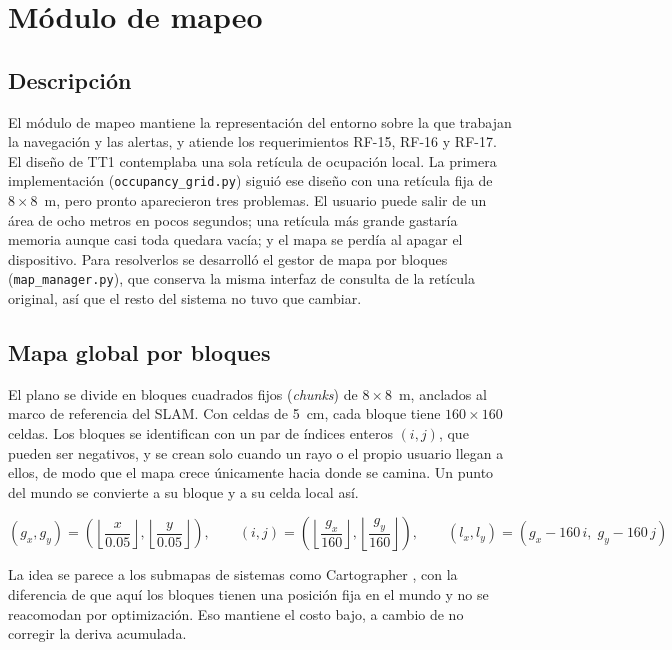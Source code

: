 \section{Módulo de mapeo}
\label{sec:dev_mapeo}

\subsection{Descripción}

El módulo de mapeo mantiene la representación del entorno sobre la que trabajan la
navegación y las alertas, y atiende los requerimientos RF-15, RF-16 y RF-17. El diseño
de TT1 contemplaba una sola retícula de ocupación local. La primera implementación
(\texttt{occupancy\_grid.py}) siguió ese diseño con una retícula fija de
$8 \times 8$~m, pero pronto aparecieron tres problemas. El usuario puede salir de un
área de ocho metros en pocos segundos; una retícula más grande gastaría memoria aunque
casi toda quedara vacía; y el mapa se perdía al apagar el dispositivo. Para resolverlos
se desarrolló el gestor de mapa por bloques (\texttt{map\_manager.py}), que conserva la
misma interfaz de consulta de la retícula original, así que el resto del sistema no tuvo
que cambiar.

\subsection{Mapa global por bloques}

El plano se divide en bloques cuadrados fijos (\emph{chunks}) de $8 \times 8$~m,
anclados al marco de referencia del SLAM. Con celdas de 5~cm, cada bloque tiene
$160 \times 160$ celdas. Los bloques se identifican con un par de índices enteros
$(i, j)$, que pueden ser negativos, y se crean solo cuando un rayo o el propio usuario
llegan a ellos, de modo que el mapa crece únicamente hacia donde se camina. Un punto del
mundo se convierte a su bloque y a su celda local así.

\[
(g_x, g_y) = \left(\left\lfloor \frac{x}{0.05} \right\rfloor,
                   \left\lfloor \frac{y}{0.05} \right\rfloor\right),
\qquad
(i, j) = \left(\left\lfloor \frac{g_x}{160} \right\rfloor,
               \left\lfloor \frac{g_y}{160} \right\rfloor\right),
\qquad
(l_x, l_y) = (g_x - 160\,i,\; g_y - 160\,j)
\]

La idea se parece a los submapas de sistemas como Cartographer
\cite{hess2016cartographer}, con la diferencia de que aquí los bloques tienen una
posición fija en el mundo y no se reacomodan por optimización. Eso mantiene el costo
bajo, a cambio de no corregir la deriva acumulada.


